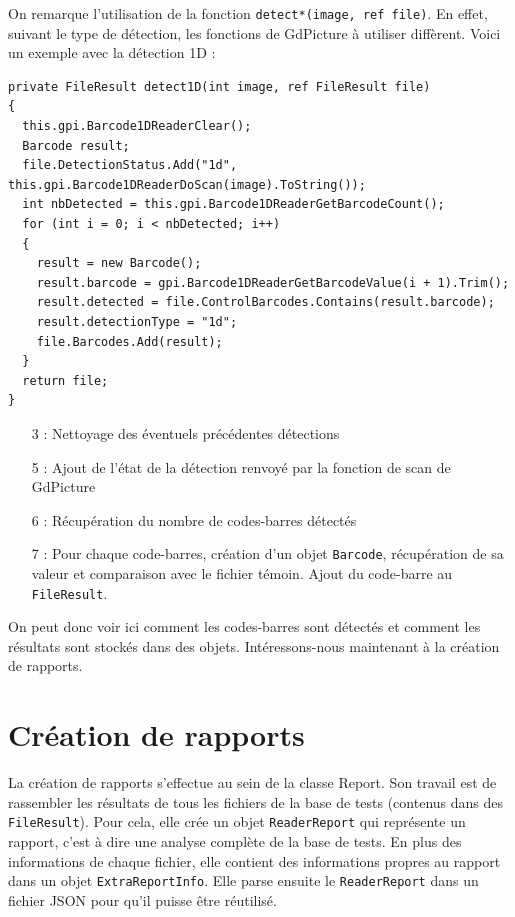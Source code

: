 On remarque l'utilisation de la fonction \verb|detect*(image, ref file)|. En effet, suivant le type de détection, les fonctions de GdPicture à utiliser diffèrent. Voici un exemple avec la détection 1D :

\begin{lstlisting}
private FileResult detect1D(int image, ref FileResult file)
{
  this.gpi.Barcode1DReaderClear();
  Barcode result;
  file.DetectionStatus.Add("1d", this.gpi.Barcode1DReaderDoScan(image).ToString());
  int nbDetected = this.gpi.Barcode1DReaderGetBarcodeCount();
  for (int i = 0; i < nbDetected; i++)
  {
    result = new Barcode();
    result.barcode = gpi.Barcode1DReaderGetBarcodeValue(i + 1).Trim();
    result.detected = file.ControlBarcodes.Contains(result.barcode);
    result.detectionType = "1d";
    file.Barcodes.Add(result);
  }
  return file;
}
\end{lstlisting}

\begin{itemize}
\item[3 :] Nettoyage des éventuels précédentes détections
\item[5 :] Ajout de l'état de la détection renvoyé par la fonction de scan de GdPicture
\item[6 :] Récupération du nombre de codes-barres détectés
\item[7 :] Pour chaque code-barres, création d'un objet \verb|Barcode|, récupération de sa valeur et comparaison avec le fichier témoin. Ajout du code-barre au \verb|FileResult|.
\end{itemize}

On peut donc voir ici comment les codes-barres sont détectés et comment les résultats sont stockés dans des objets. Intéressons-nous maintenant à la création de rapports.

\section{Création de rapports}

La création de rapports s'effectue au sein de la classe Report. Son travail est de rassembler les résultats de tous les fichiers de la base de tests (contenus dans des \verb|FileResult|). Pour cela, elle crée un objet \verb|ReaderReport| qui représente un rapport, c'est à dire une analyse complète de la base de tests. En plus des informations de chaque fichier, elle contient des informations propres au rapport dans un objet \verb|ExtraReportInfo|. Elle parse ensuite le \verb|ReaderReport| dans un fichier JSON pour qu'il puisse être réutilisé.

